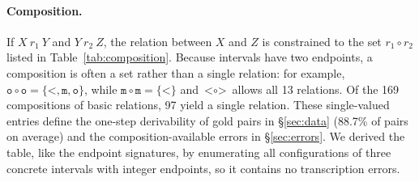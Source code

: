 \documentclass[11pt]{article}
\newcommand{\rel}[1]{\texttt{#1}}
\begin{document}
\paragraph{Composition.}
If $X\ r_1\ Y$ and $Y\ r_2\ Z$, the relation between $X$ and $Z$ is constrained to the set $r_1\circ r_2$ listed in Table~\ref{tab:composition}. Because intervals have two endpoints, a composition is often a set rather than a single relation: for example, $\rel{o}\circ\rel{o}=\{\rel{<},\rel{m},\rel{o}\}$, while $\rel{m}\circ\rel{m}=\{\rel{<}\}$ and $\rel{<}\circ\rel{>}$ allows all 13 relations. Of the 169 compositions of basic relations, 97 yield a single relation. These single-valued entries define the one-step derivability of gold pairs in \S\ref{sec:data} (88.7\% of pairs on average) and the composition-available errors in \S\ref{sec:errors}. We derived the table, like the endpoint signatures, by enumerating all configurations of three concrete intervals with integer endpoints, so it contains no transcription errors.
\end{document}
